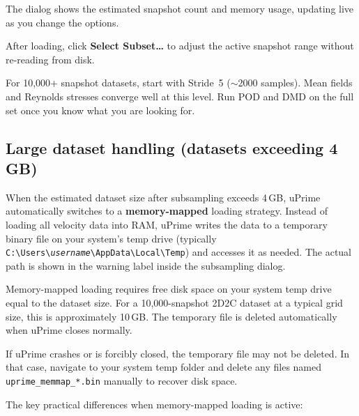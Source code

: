 \documentclass[11pt, a4paper]{report}
\newcommand{\uipth}[1]{\textbf{\textcolor{upblue}{#1}}}
\begin{document}
The dialog shows the estimated snapshot count and memory usage, updating live as you change the options.

After loading, click \uipth{Select Subset\ldots} to adjust the active snapshot range without re-reading from disk.

\begin{tipbox}
For 10,000+ snapshot datasets, start with Stride~5 ($\sim$2000 samples). Mean fields and Reynolds stresses converge well at this level. Run POD and DMD on the full set once you know what you are looking for.
\end{tipbox}

\subsection{Large dataset handling (datasets exceeding 4\,GB)}

When the estimated dataset size after subsampling exceeds 4\,GB, uPrime automatically switches to a \textbf{memory-mapped} loading strategy. Instead of loading all velocity data into RAM, uPrime writes the data to a temporary binary file on your system's temp drive (typically \texttt{C:\textbackslash Users\textbackslash \textit{username}\textbackslash AppData\textbackslash Local\textbackslash Temp}) and accesses it as needed. The actual path is shown in the warning label inside the subsampling dialog.

\begin{notebox}
Memory-mapped loading requires free disk space on your system temp drive equal to the dataset size. For a 10,000-snapshot 2D2C dataset at a typical grid size, this is approximately 10\,GB. The temporary file is deleted automatically when uPrime closes normally.
\end{notebox}

\begin{warnbox}
If uPrime crashes or is forcibly closed, the temporary file may not be deleted. In that case, navigate to your system temp folder and delete any files named \texttt{uprime\_memmap\_*.bin} manually to recover disk space.
\end{warnbox}

The key practical differences when memory-mapped loading is active:
\end{document}
